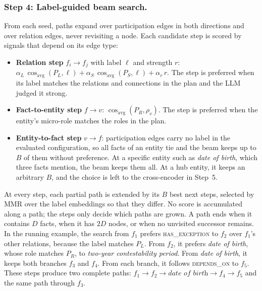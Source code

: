 \documentclass[sigconf, review, anonymous]{acmart}
\newcommand{\rel}[1]{\textsc{#1}}            %
\newcommand{\simcos}{\operatorname{cos}}
\begin{document}
\subsubsection*{Step 4: Label-guided beam search.}
From each seed, paths expand over participation edges in both directions and over relation edges, never revisiting a node. Each candidate step is scored by signals that depend on its edge type:
\begin{itemize}
  \item \textbf{Relation step} $f_i \to f_j$ with label $\ell$ and strength $r$: $\alpha_L\, \simcos_{\mathrm{avg}}(P_L, \ell) + \alpha_S\, \simcos_{\mathrm{avg}}(P_S, \ell) + \alpha_r\, r$. The step is preferred when its label matches the relations and connections in the plan and the LLM judged it strong.
  \item \textbf{Fact-to-entity step} $f \to v$: $\simcos_{\mathrm{avg}}(P_R, \rho_v)$. The step is preferred when the entity's micro-role matches the roles in the plan.
  \item \textbf{Entity-to-fact step} $v \to f$: participation edges carry no label in the evaluated configuration, so all facts of an entity tie and the beam keeps up to $B$ of them without preference. At a specific entity such as \emph{date of birth}, which three facts mention, the beam keeps them all. At a hub entity, it keeps an arbitrary $B$, and the choice is left to the cross-encoder in Step~5.
\end{itemize}
At every step, each partial path is extended by its $B$ best next steps, selected by MMR over the label embeddings so that they differ. No score is accumulated along a path; the steps only decide which paths are grown. A path ends when it contains $D$ facts, when it has $2D$ nodes, or when no unvisited successor remains. In the running example, the search from $f_1$ prefers \rel{has\_exception} to $f_2$ over $f_1$'s other relations, because the label matches $P_L$. From $f_2$, it prefers \emph{date of birth}, whose role matches $P_R$, to \emph{two-year contestability period}. From \emph{date of birth}, it keeps both branches $f_3$ and $f_4$. From each branch, it follows \rel{depends\_on} to $f_5$. These steps produce two complete paths: $f_1 \to f_2 \to \textit{date of birth} \to f_4 \to f_5$ and the same path through $f_3$.
\end{document}
